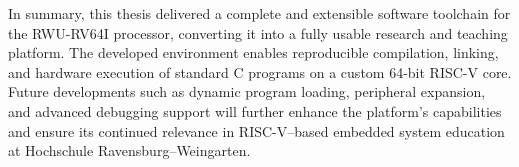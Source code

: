 In summary, this thesis delivered a complete and extensible software toolchain for the RWU-RV64I processor, converting it into a fully usable research and teaching platform.  
The developed environment enables reproducible compilation, linking, and hardware execution of standard C programs on a custom 64-bit RISC-V core.  
Future developments such as dynamic program loading, peripheral expansion, and advanced debugging support will further enhance the platform’s capabilities and ensure its continued relevance in RISC-V–based embedded system education at Hochschule Ravensburg–Weingarten.

